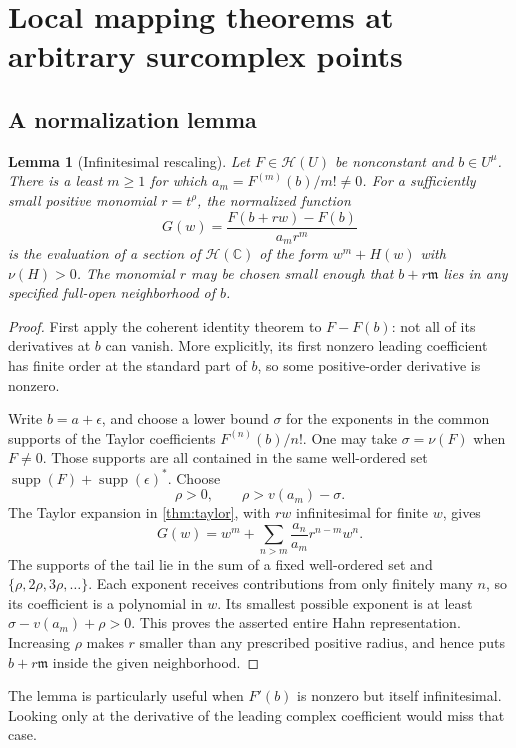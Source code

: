\documentclass[11pt,oneside]{article}
\numberwithin{equation}{section}
\newtheorem{lemma}[theorem]{Lemma}
\theoremstyle{definition}
\theoremstyle{remark}\newtheorem{remark}[theorem]{Remark}
\newcommand{\C}{\mathbb C}
\newcommand{\HH}{\mathscr H}
\newcommand{\m}{\mathfrak m}
\newcommand{\supp}{\operatorname{supp}}
\begin{document}
\section{Local mapping theorems at arbitrary surcomplex points}
\subsection{A normalization lemma}
\begin{lemma}[Infinitesimal rescaling]\label{lem:normalize}
Let $F\in\HH(U)$ be nonconstant and $b\in U^\mu$. There is a least
$m\geq1$ for which $a_m=F^{(m)}(b)/m!\ne0$. For a sufficiently small
positive monomial $r=t^\rho$, the normalized function
\begin{equation}\label{eq:normalize}
 G(w)=\frac{F(b+rw)-F(b)}{a_mr^m}
\end{equation}
is the evaluation of a section of $\HH(\C)$ of the form
$w^m+H(w)$ with $\nu(H)>0$. The monomial $r$ may be chosen small enough
that $b+r\m$ lies in any specified full-open neighborhood of $b$.
\end{lemma}
\begin{proof}
First apply the coherent identity theorem to $F-F(b)$: not all of its
derivatives at $b$ can vanish. More explicitly, its first nonzero leading
coefficient has finite order at the standard part of $b$, so some
positive-order derivative is nonzero.

Write $b=a+\epsilon$, and choose a lower bound $\sigma$ for the exponents
in the common supports of the Taylor coefficients $F^{(n)}(b)/n!$.
One may take $\sigma=\nu(F)$ when $F\ne0$. Those supports are all
contained in the same well-ordered set
$\supp(F)+\supp(\epsilon)^*$. Choose
\[
 \rho>0,\qquad \rho>v(a_m)-\sigma.
\]
The Taylor expansion in \cref{thm:taylor}, with $rw$ infinitesimal for
finite $w$, gives
\[
 G(w)=w^m+\sum_{n>m}\frac{a_n}{a_m}r^{n-m}w^n.
\]
The supports of the tail lie in the sum of a fixed well-ordered set and
$\{\rho,2\rho,3\rho,\ldots\}$. Each exponent receives contributions from
only finitely many $n$, so its coefficient is a polynomial in $w$.
Its smallest possible exponent is at least
$\sigma-v(a_m)+\rho>0$. This proves the asserted entire Hahn
representation. Increasing $\rho$ makes $r$ smaller than any prescribed
positive radius, and hence puts $b+r\m$ inside the given neighborhood.
\end{proof}
The lemma is particularly useful when $F'(b)$ is nonzero but itself
infinitesimal. Looking only at the derivative of the leading complex
coefficient would miss that case.
\end{document}
